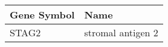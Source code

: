 \begin{tabular}{ll}
\toprule
Gene Symbol &              Name \\
\midrule
      STAG2 & stromal antigen 2 \\
\bottomrule
\end{tabular}
